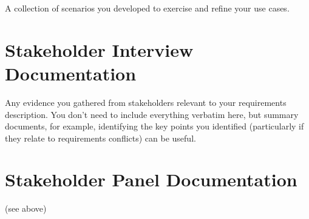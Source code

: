 \documentclass{l3deliverable}
\begin{document}
A collection of scenarios you developed to exercise and refine your
use cases.

\section{Stakeholder Interview Documentation}

Any evidence you gathered from stakeholders relevant to your
requirements description.  You don't need to include everything
verbatim here, but summary documents, for example, identifying the key
points you identified (particularly if they relate to requirements
conflicts) can be useful.

\section{Stakeholder Panel Documentation}

(see above)

\end{document}

